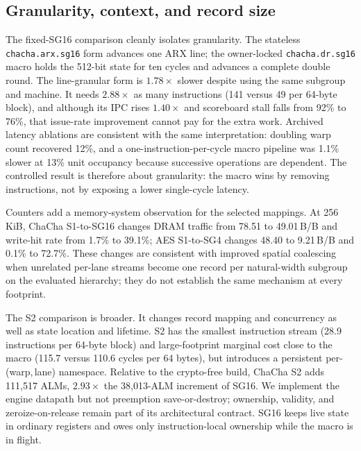 \documentclass[conference]{IEEEtran}
\begin{document}
\subsection{Granularity, context, and record size}
\begin{table}[t]
\centering
\caption{ChaCha design points at the large footprint; instructions and cycles
are marginal values per 64\,B. Private bits are per in-flight instruction
(ChaCha/Poly for HARE) or per core for S2. The line-granular row is a
non-deployed control.}
\label{tab:state}
\scriptsize
\setlength{\tabcolsep}{2pt}

\end{table}
The fixed-SG16 comparison cleanly isolates granularity. The stateless
\texttt{chacha.arx.sg16} form advances one ARX line;
the owner-locked \texttt{chacha.dr.sg16} macro holds the 512-bit state for ten
cycles and advances a complete double round. The line-granular form is
$1.78\times$ slower despite using the same subgroup and machine. It needs
$2.88\times$ as many instructions (141 versus 49 per 64-byte block), and
although its IPC rises $1.40\times$ and scoreboard stall falls from 92\% to
76\%, that issue-rate improvement cannot pay for the extra work. Archived
latency ablations are consistent with the same interpretation: doubling warp
count recovered 12\%, and a one-instruction-per-cycle macro pipeline was
1.1\% slower at 13\% unit occupancy because successive operations are
dependent. The controlled result is therefore about granularity: the macro
wins by removing instructions, not by exposing a lower single-cycle latency.

Counters add a memory-system observation for the selected mappings. At
256\,KiB, ChaCha S1-to-SG16 changes DRAM traffic from 78.51 to 49.01\,B/B
and write-hit rate from 1.7\% to 39.1\%; AES S1-to-SG4 changes 48.40 to
9.21\,B/B and 0.1\% to 72.7\%. These changes are consistent with improved
spatial coalescing when unrelated per-lane streams become one record per
natural-width subgroup on the evaluated hierarchy; they do not establish
the same mechanism at every footprint.

The S2 comparison is broader. It changes record mapping and concurrency as
well as state location and lifetime. S2 has the smallest instruction stream
(28.9 instructions per 64-byte block) and large-footprint marginal cost close
to the macro (115.7 versus 110.6 cycles per 64 bytes), but introduces a
persistent per-(warp,\,lane) namespace. Relative to the crypto-free build,
ChaCha S2 adds 111{,}517 ALMs, $2.93\times$ the 38{,}013-ALM increment of
SG16. We implement the engine datapath but not preemption save-or-destroy;
ownership, validity, and zeroize-on-release remain part of its architectural
contract. SG16 keeps live state in ordinary registers and owes only
instruction-local ownership while the macro is in flight.
\end{document}
